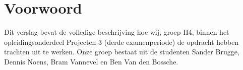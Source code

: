 
\chapter*{Voorwoord}
\label{ch:voorwoord}


Dit verslag bevat de volledige beschrijving hoe wij, groep H4, binnen het opleidingsonderdeel Projecten 3 (derde examenperiode) de opdracht hebben trachten uit te werken. Onze groep bestaat uit de studenten Sander Brugge, Dennis Noens, Bram Vannevel en Ben Van den Bossche. 

